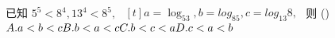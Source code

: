 \documentclass[class=ctexart,crop=false]{standalone}
\begin{document}
已知 $5^5<8^4,13^4<8^5,$ $\begin{aligned}[t]
    a=\log_53,b=log_85,c=log_{13} 8,
\end{aligned}$ 则 \hfill (\qquad)\\
$A. a<b<c\hfill B. b<a<c\hfill C. b<c<a\hfill D. c<a<b\hfill$
\end{document}

